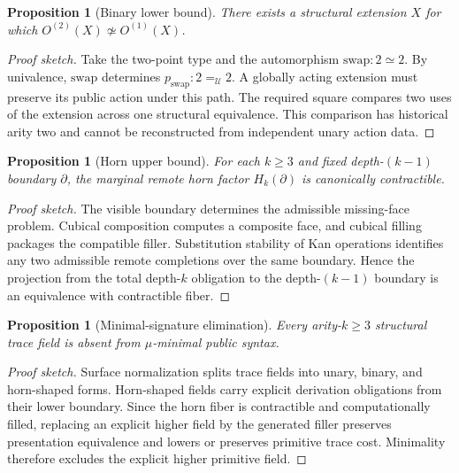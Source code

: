 \documentclass[11pt]{article}
\theoremstyle{plain}
\newtheorem{proposition}[theorem]{Proposition}
\theoremstyle{definition}
\theoremstyle{remark}
\newenvironment{proofsketch}{\begin{proof}[Proof sketch]}{\end{proof}}
\newcommand{\U}{\mathcal{U}}
\begin{document}
\begin{proposition}[Binary lower bound]
There exists a structural extension \(X\) for which \(O^{(2)}(X)\not\simeq O^{(1)}(X)\).
\end{proposition}

\begin{proofsketch}
Take the two-point type and the automorphism \(\mathrm{swap}:2\simeq2\). By univalence, \(\mathrm{swap}\) determines \(p_{\mathrm{swap}}:2=_{\U}2\). A globally acting extension must preserve its public action under this path. The required square compares two uses of the extension across one structural equivalence. This comparison has historical arity two and cannot be reconstructed from independent unary action data.
\end{proofsketch}

\begin{proposition}[Horn upper bound]
For each \(k\ge3\) and fixed depth-\((k-1)\) boundary \(\partial\), the marginal remote horn factor \(H_k(\partial)\) is canonically contractible.
\end{proposition}

\begin{proofsketch}
The visible boundary determines the admissible missing-face problem. Cubical composition computes a composite face, and cubical filling packages the compatible filler. Substitution stability of Kan operations identifies any two admissible remote completions over the same boundary. Hence the projection from the total depth-\(k\) obligation to the depth-\((k-1)\) boundary is an equivalence with contractible fiber.
\end{proofsketch}

\begin{proposition}[Minimal-signature elimination]
Every arity-\(k\ge3\) structural trace field is absent from \(\mu\)-minimal public syntax.
\end{proposition}

\begin{proofsketch}
Surface normalization splits trace fields into unary, binary, and horn-shaped forms. Horn-shaped fields carry explicit derivation obligations from their lower boundary. Since the horn fiber is contractible and computationally filled, replacing an explicit higher field by the generated filler preserves presentation equivalence and lowers or preserves primitive trace cost. Minimality therefore excludes the explicit higher primitive field.
\end{proofsketch}
\end{document}
